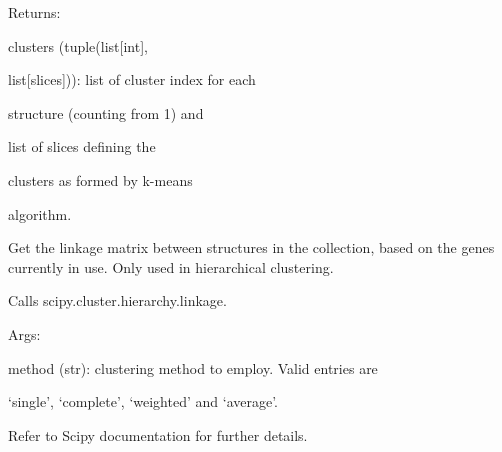 \documentclass[letterpaper,10pt,english]{sphinxmanual}
\begin{document}
\begin{fulllineitems}
\begin{fulllineitems}
\begin{DUlineblock}{0em}
\item[] Returns:
\item[]
\begin{DUlineblock}{\DUlineblockindent}
\item[] clusters (tuple(list{[}int{]},
\item[]
\begin{DUlineblock}{\DUlineblockindent}
\item[] list{[}slices{]})): list of cluster index for each
\item[]
\begin{DUlineblock}{\DUlineblockindent}
\item[] structure (counting from 1) and
\item[] list of slices defining the
\item[] clusters as formed by k-means
\item[] algorithm.
\end{DUlineblock}
\end{DUlineblock}
\end{DUlineblock}
\end{DUlineblock}

\end{fulllineitems}


\begin{fulllineitems}
\label{doctree/soprano.analyse.phylogen.phylogenclust:soprano.analyse.phylogen.phylogenclust.PhylogenCluster.get_linkage}
Get the linkage matrix between structures in the collection,
based on the genes currently in use. Only used in hierarchical
clustering.

Calls scipy.cluster.hierarchy.linkage.

\begin{DUlineblock}{0em}
\item[] Args:
\item[]
\begin{DUlineblock}{\DUlineblockindent}
\item[] method (str): clustering method to employ. Valid entries are
\item[]
\begin{DUlineblock}{\DUlineblockindent}
\item[] `single', `complete', `weighted' and `average'.
\item[] Refer to Scipy documentation for further details.
\end{DUlineblock}
\end{DUlineblock}
\end{DUlineblock}


\end{fulllineitems}
\end{fulllineitems}
\end{document}

